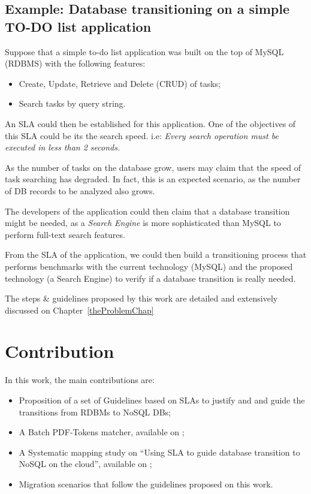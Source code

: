 \subsection{Example: Database transitioning on a simple TO-DO list application}

Suppose that a simple to-do list application was built on the top of MySQL (RDBMS) with the following features:

\begin{itemize}
   \item{Create, Update, Retrieve and Delete (CRUD) of tasks;}
   \item{Search tasks by query string.}
\end{itemize}

An SLA could then be established for this application. One of the objectives of this SLA could be its the search speed. i.e: \textit{Every search operation must be executed in less than 2 seconds.}

As the number of tasks on the database grow, users may claim that the speed of task searching has degraded. In fact, this is an expected scenario, as the number of DB records to be analyzed also grows.

The developers of the application could then claim that a database transition might be needed, as a \textit{Search Engine} is more sophisticated than MySQL to perform full-text search features. 

From the SLA of the application, we could then build a transitioning process that performs benchmarks with the current technology (MySQL) and the proposed technology (a Search Engine) to verify if a database transition is really needed.

The steps \& guidelines proposed by this work are detailed and extensively discussed on Chapter~\ref{theProblemChap}

\section{Contribution}

In this work, the main contributions are: 

\begin{itemize}
   \item{Proposition of a set of Guidelines based on SLAs to justify and and guide the transitions from RDBMs to NoSQL DBs;}
   \item{A Batch PDF-Tokens matcher, available on \cite{pythonBatchPDFTokenMatcher};}
   \item{A Systematic mapping study on ``Using SLA to guide database transition to NoSQL on the cloud'', available on \cite{fabioMartinSM};}
   \item{Migration scenarios that follow the guidelines proposed on this work.}
\end{itemize}

